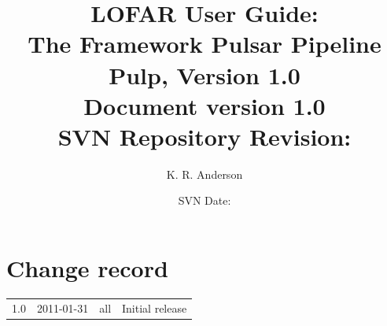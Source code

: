 \documentclass[a4paper,10pt,bibtotoc]{scrartcl}
\begin{document}

\title{LOFAR User Guide: \\ The Framework Pulsar Pipeline\\
{\large Pulp, Version 1.0} \\ 
{\normalsize Document version 1.0} \\
{\normalsize SVN Repository Revision: \svnInfoRevision}}
\author{K. R. Anderson}
\date{\small{SVN Date: \svnInfoDate}}
\maketitle

\tableofcontents

\clearpage


\section*{Change record}

\begin{center}
  \tablelasttail{\hline}
  \begin{supertabular}{lllp{10cm}}
    1.0 & 2011-01-31 & all & Initial release \\
  \end{supertabular}
\end{center}
\clearpage

\end{document}

